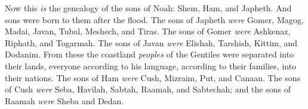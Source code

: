 
\bverse Now this \textit{is} the genealogy of the sons of Noah: Shem, Ham, and Japheth. And sons were born to them after the flood.
\bverse The sons of Japheth \textit{were} Gomer, Magog, Madai, Javan, Tubal, Meshech, and Tiras.
\bverse The sons of Gomer \textit{were} Ashkenaz, Riphath, and Togarmah.
\bverse The sons of Javan \textit{were} Elishah, Tarshish, Kittim, and Dodanim.
\bverse From these the coastland \textit{peoples} of the Gentiles were separated into their lands, everyone according to his language, according to their families, into their nations.
\bverse The sons of Ham \textit{were} Cush, Mizraim, Put, and Canaan.
\bverse The sons of Cush \textit{were} Seba, Havilah, Sabtah, Raamah, and Sabtechah; and the sons of Raamah \textit{were} Sheba and Dedan.
\bverse 
\bverse 
\bverse 
\bverse 
\bverse 
\bverse 
\bverse 
\bverse 
\bverse 
\bverse 
\bverse 
\bverse 
\bverse 
\bverse 
\bverse 
\bverse 
\bverse 
\bverse 
\bverse 
\bverse 
\bverse 
\bverse 
\bverse 
\bverse 
\bverse 
